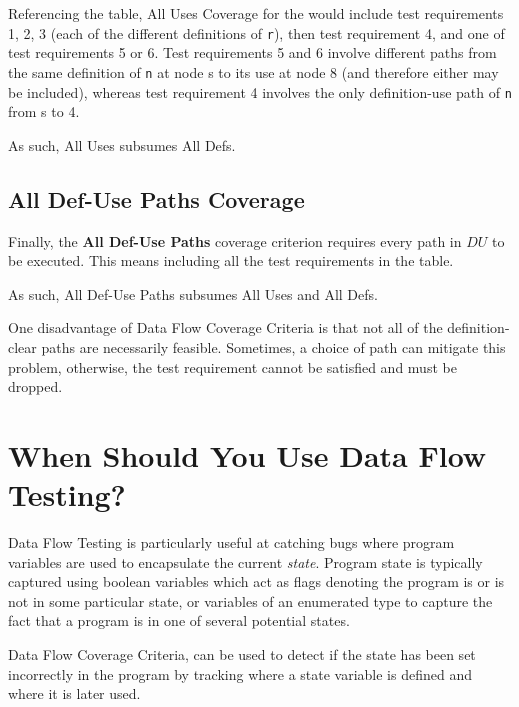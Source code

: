 
Referencing the table, All Uses Coverage for the \signmethod would include
test requirements 1, 2, 3 (each of the different definitions of {\tt r}), then 
test requirement 4, and one of test requirements 5 or 6. Test requirements 5 and
6 involve different paths from the same definition of {\tt n} at node s to its
use at node 8 (and therefore either may be included), whereas test requirement 4
involves the only definition-use path of {\tt n} from s to 4.

As such, All Uses subsumes All Defs.


\subsection{All Def-Use Paths Coverage}

Finally, the {\bf All Def-Use Paths} coverage criterion requires every path in
$DU$ to be executed. This means including all the test requirements in the table.


As such, All Def-Use Paths subsumes All Uses and All Defs.

One disadvantage of Data Flow Coverage Criteria is that not all of the
definition-clear paths are necessarily feasible. Sometimes, a choice of path can
mitigate this problem, otherwise, the test requirement cannot be satisfied and
must be dropped.



\section{When Should You Use Data Flow Testing?}

Data Flow Testing is particularly useful at catching bugs where program
variables are used to encapsulate the current {\it state}. Program state is
typically captured using boolean variables which act as flags denoting the
program is or is not in some particular state, or variables of an enumerated
type to capture the fact that a program is in one of several potential states.

Data Flow Coverage Criteria, can be used to detect if the state has been set
incorrectly in the program by tracking where a state variable is defined and
where it is later used. 

